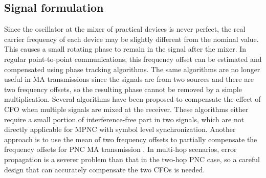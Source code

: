 


\subsection{Signal formulation}
Since the oscillator at the mixer of practical devices is never perfect, the real carrier frequency of each device may be slightly different from the nominal value. This causes a small rotating phase to remain in the signal after the mixer. In regular point-to-point communications,  this frequency offset can be estimated and compensated using phase tracking algorithms. The same algorithms are no longer useful in MA transmissions since the signals are from two sources and there are two frequency offsets, so the resulting phase cannot be removed by a simple multiplication. 
Several algorithms have been proposed \cite{lu2013implementation,katti2007embracing, gollakota2008zigzag, fung2010preamble} to compensate the effect of CFO when multiple signals are mixed at the receiver. These algorithms either require a small portion of interference-free part in two signals, which are not directly applicable for MPNC with symbol level synchronization. Another approach is to use the mean of two frequency offsets to partially compensate the frequency offsets for PNC MA transmission \cite{lu2013implementation}. In multi-hop scenarios, error propagation is a severer problem than that in the two-hop PNC case,  so a careful design that can accurately compensate the two CFOs is needed.

